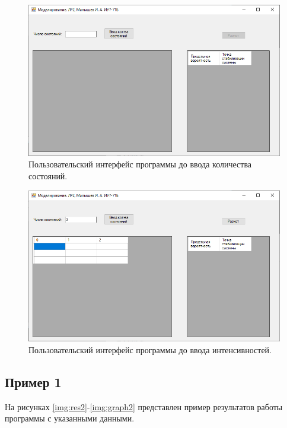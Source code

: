 \documentclass[12pt]{report}
\begin{document}
\begin{figure}[H]
	\begin{center}
		\includegraphics[scale=0.6]{imgs/ui1.png}
	\end{center}
	\caption{Пользовательский интерфейс программы до ввода количества состояний.}
	\label{img:ui1}
\end{figure}

\begin{figure}[H]
	\begin{center}
		\includegraphics[scale=0.6]{imgs/ui2.png}
	\end{center}
	\caption{Пользовательский интерфейс программы до ввода интенсивностей.}
	\label{img:ui2}
\end{figure}

\subsection{Пример 1}

На рисунках \ref{img:res2}-\ref{img:graph2} представлен пример результатов работы программы с указанными данными.
\end{document}

